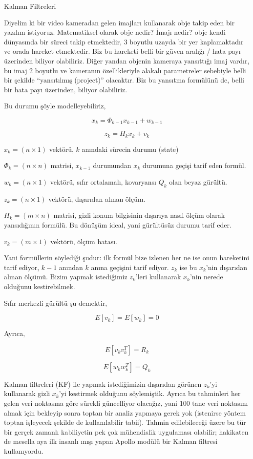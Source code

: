 \documentclass[12pt,fleqn]{article}\usepackage{../../common}
\begin{document}
Kalman Filtreleri

Diyelim ki bir video kameradan gelen imajları kullanarak obje takip eden bir
yazılım istiyoruz. Matematiksel olarak obje nedir? İmajı nedir? obje kendi
dünyasında bir süreci takip etmektedir, 3 boyutlu uzayda bir yer kaplamaktadır
ve orada hareket etmektedir. Biz bu hareketi belli bir güven aralığı / hata payı
üzerinden biliyor olabiliriz. Diğer yandan objenin kameraya yansıttığı imaj
vardır, bu imaj 2 boyutlu ve kameranın özellikleriyle alakalı parametreler
sebebiyle belli bir şekilde ``yansıtılmış (project)'' olacaktır. Biz bu yansıtma
formülünü de, belli bir hata payı üzerinden, biliyor olabiliriz.

Bu durumu şöyle modelleyebiliriz,

$$ x_k = \Phi_{k-1}x_{k-1} + w_{k-1} $$

$$ z_k = H_k x_k + v_k $$

$x_k = (n \times 1)$ vektörü, $k$ anındaki sürecin durumu (state)

$\Phi_k = (n \times n)$ matrisi, $x_{k-1}$ durumundan $x_{k}$ durumuna
geçişi tarif eden formül.

$w_k = (n \times 1)$ vektörü, sıfır ortalamalı, kovaryansı $Q_k$ olan beyaz
gürültü.

$z_k = (n \times 1)$ vektörü, dışarıdan alınan ölçüm.

$H_k = (m \times n)$ matrisi, gizli konum bilgisinin dışarıya nasıl ölçüm olarak
yansıdığının formülü. Bu dönüşüm ideal, yani gürültüsüz durumu tarif eder.

$v_k = (m \times 1)$ vektörü, ölçüm hatası.

Yani formüllerin söylediği şudur: ilk formül bize izlenen her ne ise onun
hareketini tarif ediyor, $k-1$ anından $k$ anına geçişini tarif ediyor. $z_k$
ise bu $x_k$'nin dışarıdan alınan ölçümü. Bizim yapmak istediğimiz $z_k$'leri
kullanarak $x_k$'nin nerede olduğunu kestirebilmek.

Sıfır merkezli gürültü şu demektir,

$$ E[v_k] = E[w_k] = 0 $$

Ayrıca,

$$ E[v_kv_k^T] = R_k $$

$$ E[w_kw_k^T] = Q_k $$

Kalman filtreleri (KF) ile yapmak istediğimizin dışarıdan görünen $z_k$'yi
kullanarak gizli $x_k$'yi kestirmek olduğunu söylemiştik. Ayrıca bu tahminleri
her gelen veri noktasına göre sürekli güncelliyor olacağız, yani 100 tane veri
noktasını almak için bekleyip sonra toptan bir analiz yapmaya gerek yok
(istenirse yöntem toptan işleyecek şekilde de kullanılabilir tabii). Tahmin
edilebileceği üzere bu tür bir gerçek zamanlı kabiliyetin pek çok mühendislik
uygulaması olabilir; hakikaten de mesella aya ilk insanlı ınışı yapan Apollo
modülü bir Kalman filtresi kullanıyordu.
\end{document}
